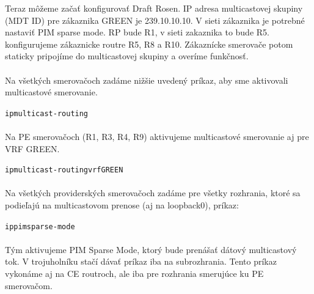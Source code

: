 \documentclass[12pt,twoside,a4paper]{report}
\begin{document}
Teraz môžeme začať konfigurovať Draft Rosen. IP adresa multicastovej skupiny (MDT ID) pre zákaznika GREEN je 239.10.10.10. V sieti zákaznika je potrebné nastaviť PIM sparse mode. RP bude R1, v sieti zakaznika to bude R5. konfigurujeme zákaznicke routre R5, R8 a R10. Zákaznícke smerovače potom staticky pripojíme do multicastovej skupiny a overíme funkčnosť.

\paragraph{}
Na všetkých smerovačoch zadáme nižšie uvedený príkaz, aby sme aktivovali multicastové smerovanie.
\noindent
{\selectfont
\begin{small}
\begin{alltt}
ip multicast-routing
\end{alltt}
\end{small}
}


\paragraph{}
Na PE smerovačoch (R1, R3, R4, R9) aktivujeme multicastové smerovanie aj pre VRF GREEN.

\noindent
{\selectfont
\begin{small}
\begin{alltt}
ip multicast-routing vrf GREEN
\end{alltt}
\end{small}
}



\paragraph{}
Na všetkých providerských smerovačoch zadáme pre všetky rozhrania, ktoré sa podieľajú na multicastovom prenose (aj na loopback0), príkaz:

\noindent
{\selectfont
\begin{small}
\begin{alltt}
ip pim sparse-mode
\end{alltt}
\end{small}
}

\paragraph{}
Tým aktivujeme PIM Sparse Mode, ktorý bude prenášať dátový multicastový tok. V trojuholníku stačí dávať príkaz iba na subrozhrania. Tento príkaz vykonáme aj na CE routroch, ale iba pre rozhrania smerujúce ku PE smerovačom.
\end{document}
